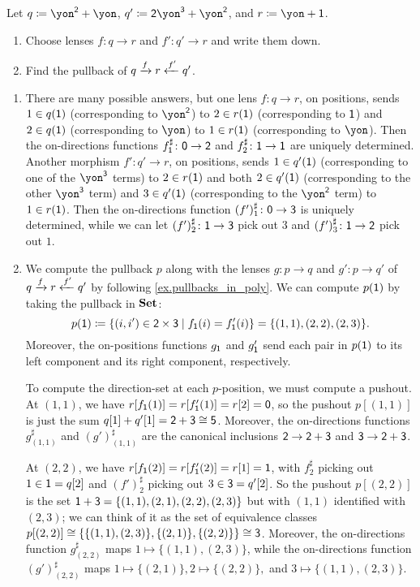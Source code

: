 \documentclass[Book-Poly]{subfiles}
\begin{document}
\begin{exercise}
Let $q\coloneqq \yon^\2+\yon$, $q'\coloneqq\2\yon^\3+\yon^\2$, and $r\coloneq\yon+\1$.
\begin{enumerate}
	\item Choose lenses $f\colon q\to r$ and $f'\colon q'\to r$ and write them down.
	\item Find the pullback of $q\xrightarrow{f} r\xleftarrow{f'} q'$.
\qedhere
\end{enumerate}
\begin{solution}
\begin{enumerate}
    \item There are many possible answers, but one lens $f \colon q \to r$, on positions, sends $1 \in q(\textsf{1})$ (corresponding to $\yon^\2$) to $2 \in r(\textsf{1})$ (corresponding to $\textsf{1}$) and $2 \in q(\textsf{1})$ (corresponding to $\yon$) to $1 \in r(\textsf{1})$ (corresponding to $\yon$).
    Then the on-directions functions $f^\sharp_{\textsf{1}} \colon \textsf{0} \to \textsf{2}$ and $f^\sharp_2 \colon \textsf{1} \to \textsf{1}$ are uniquely determined.
    Another morphism $f' \colon q' \to r$, on positions, sends $1 \in q'(\textsf{1})$ (corresponding to one of the $\yon^\3$ terms) to $2 \in r(\textsf{1})$ and both $2 \in q'(\textsf{1})$ (corresponding to the other $\yon^\3$ term) and $3 \in q'(\textsf{1})$ (corresponding to the $\yon^\2$ term) to $1 \in r(\textsf{1})$.
    Then the on-directions function $(f')^\sharp_1 \colon \textsf{0} \to \textsf{3}$ is uniquely determined, while we can let $(f')^\sharp_2 \colon \textsf{1} \to \textsf{3}$ pick out $3$ and $(f')^\sharp_3 \colon \textsf{1} \to \textsf{2}$ pick out $1$.
    
    \item We compute the pullback $p$ along with the lenses $g \colon p \to q$ and $g' \colon p \to q'$ of $q\xrightarrow{f} r\xleftarrow{f'} q'$ by following \cref{ex.pullbacks_in_poly}.
    We can compute $p(\textsf{1})$ by taking the pullback in $\mathbf{Set}$:
    \[
        p(\textsf{1}) \coloneqq \{(i, i') \in \textsf{2} \times \textsf{3} \mid f_{\textsf{1}}(i) = f'_{\textsf{1}}(i)\} = \{(1,1), (2,2), (2,3)\}.
    \]
    Moreover, the on-positions functions $g_{\textsf{1}}$ and $g'_{\textsf{1}}$ send each pair in $p(\textsf{1})$ to its left component and its right component, respectively.
    
    To compute the direction-set at each $p$-position, we must compute a pushout.
    At $(1,1)$, we have $r[f_{\textsf{1}}(1)] = r[f'_{\textsf{1}}(1)] = r[2] = \textsf{0}$, so the pushout $p[(1,1)]$ is just the sum $q[1] + q'[1] = \textsf{2} + \textsf{3} \cong \textsf{5}$.
    Moreover, the on-directions functions $g^\sharp_{(1,1)}$ and $(g')^\sharp_{(1,1)}$ are the canonical inclusions $\textsf{2} \to \textsf{2} + \textsf{3}$ and $\textsf{3} \to \textsf{2} + \textsf{3}$.
    
    At $(2,2)$, we have $r[f_{\textsf{1}}(2)] = r[f'_{\textsf{1}}(2)] = r[1] = \textsf{1}$, with $f^\sharp_2$ picking out $1 \in \textsf{1} = q[2]$ and $(f')^\sharp_2$ picking out $3 \in \textsf{3} = q'[2]$.
    So the pushout $p[(2,2)]$ is the set $\textsf{1} + \textsf{3} = \{(1,1), (2,1), (2,2), (2,3)\}$ but with $(1,1)$ identified with $(2,3)$; we can think of it as the set of equivalence classes $p[(2,2)] \cong \{\{(1,1), (2,3)\}, \{(2,1)\}, \{(2,2)\}\} \cong \textsf{3}$.
    Moreover, the on-directions function $g^\sharp_{(2,2)}$ maps $1 \mapsto \{(1,1), (2,3)\}$, while the on-directions function $(g')^\sharp_{(2,2)}$ maps $1 \mapsto \{(2,1)\}, 2 \mapsto \{(2,2)\},$ and $3 \mapsto \{(1,1), (2,3)\}$.
    

\end{enumerate}
\end{solution}
\end{exercise}
\end{document}
